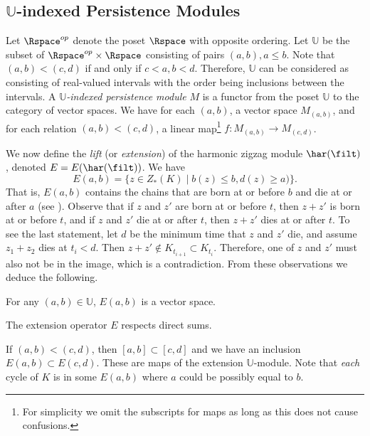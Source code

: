 \subsection{$\mathbb{U}$-indexed Persistence Modules}\label{subsec:extension}


Let $\Rspace^{op}$ denote the poset $\Rspace$ with opposite ordering. Let $\mathbb{U}$ be the subset of $\Rspace^{op}\times \Rspace$ consisting of pairs $(a,b), a\leq b$. Note that $(a,b) < (c,d)$ if and only if $c<a, b < d$. Therefore, $\mathbb{U}$ can be considered as consisting of real-valued intervals with the order being inclusions between the intervals. A \emph{$\mathbb{U}$-indexed persistence module} $M$ is a functor from the poset $\mathbb{U}$ to the category of vector spaces. We have for each $(a,b)$, a vector space $M_{(a,b)}$, and for each relation $(a,b) < (c,d)$, a linear map\footnote{For simplicity we omit the subscripts for maps as long as this does not cause confusions.} $f:M_{(a,b)} \xrightarrow{} M_{(c,d)}$.

We now define the \emph{lift} (or \emph{extension}) of the harmonic zigzag module $\har(\filt)$, denoted $E= E(\har(\filt))$. We have $$ E(a,b) = \{ z \in Z_*(K)\mid b(z) \leq b ,  d(z)  \geq a) \}.$$ That is, $E(a,b)$ contains the chains that are born at or before $b$ and die at or after $a$ (see ). Observe that if $z$ and $z'$ are born at or before $t$, then $z+z'$ is born at or before $t$, and if $z$ and $z'$ die at or after $t$, then $z+z'$ dies at or after $t$. To see the last statement, let $d$ be the minimum  time that $z$ and $z'$ die, and assume $z_1+z_2$ dies at $t_i < d$. Then $z+z' \notin K_{t_{i+1}} \subset K_{t_i}$. Therefore, one of $z$ and $z'$ must also not be in the image, which is a contradiction. From these observations we deduce the following.   


\begin{lemma}
    For any $(a,b) \in \mathbb{U}$, $E(a,b)$ is a vector space. 
\end{lemma}

\begin{lemma}\label{l:directsum}
    The extension operator $E$ respects direct sums. 
\end{lemma}


If $(a,b) < (c,d) $, then $[a,b] \subset [c,d]$ and we have an inclusion $E(a,b) \subset E(c,d)$. These are maps of the extension $\mathbb{U}$-module. Note that \textit{each} cycle of $K$ is in some $E(a,b)$ 
where $a$ could be possibly equal to $b$.


